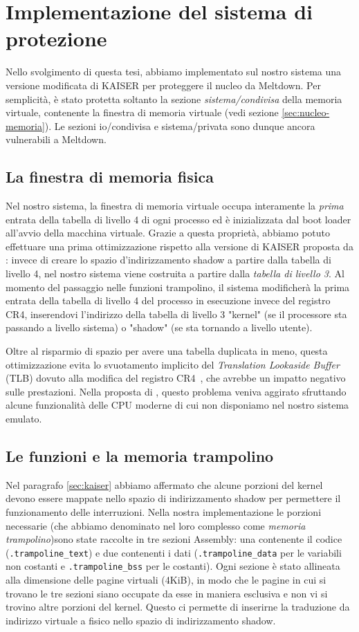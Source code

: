 \chapter{Implementazione del sistema di protezione}
Nello svolgimento di questa tesi, abbiamo implementato sul nostro sistema una versione modificata di KAISER per proteggere il nucleo da Meltdown. 
Per semplicità, è stato protetta soltanto la sezione \emph{sistema/condivisa} della memoria virtuale, contenente la finestra di memoria virtuale (vedi sezione \vref{sec:nucleo-memoria}).
Le sezioni io/condivisa e sistema/privata sono dunque ancora vulnerabili a Meltdown.

\section{La finestra di memoria fisica}
Nel nostro sistema, la finestra di memoria virtuale occupa interamente la \emph{prima} entrata della tabella di livello 4 di ogni processo ed è inizializzata dal boot loader all'avvio della macchina virtuale.
Grazie a questa proprietà, abbiamo potuto effettuare una prima ottimizzazione rispetto alla versione di KAISER proposta da \textcite{gruss:kaslr}: invece di creare lo spazio d'indirizzamento shadow a partire dalla tabella di livello 4, nel nostro sistema viene costruita a partire dalla \emph{tabella di livello 3}.
Al momento del passaggio nelle funzioni trampolino, il sistema modificherà la prima entrata della tabella di livello 4 del processo in esecuzione invece del registro CR4, inserendovi l'indirizzo della tabella di livello 3 "kernel" (se il processore sta passando a livello sistema) o "shadow" (se sta tornando a livello utente).

Oltre al risparmio di spazio per avere una tabella duplicata in meno, questa ottimizzazione evita lo svuotamento implicito del \emph{Translation Lookaside Buffer} (TLB) dovuto alla modifica del registro CR4~\cite{gruss:kaslr}, che avrebbe un impatto negativo sulle prestazioni. 
Nella proposta di \textcite{gruss:kaslr}, questo problema veniva aggirato sfruttando alcune funzionalità delle CPU moderne di cui non disponiamo nel nostro sistema emulato.

\section{Le funzioni e la memoria trampolino}
Nel paragrafo \vref{sec:kaiser} abbiamo affermato che alcune porzioni del kernel devono essere mappate nello spazio di indirizzamento shadow per permettere il funzionamento delle interruzioni.
Nella nostra implementazione le porzioni necessarie (che abbiamo denominato nel loro complesso come \emph{memoria trampolino})sono state raccolte in tre sezioni Assembly: una contenente il codice (\texttt{.trampoline\_text}) e due contenenti i dati (\texttt{.trampoline\_data} per le variabili non costanti e \texttt{.trampoline\_bss} per le costanti).
Ogni sezione è stato allineata alla dimensione delle pagine virtuali (4KiB), in modo che le pagine in cui si trovano le tre sezioni siano occupate da esse in maniera esclusiva e non vi si trovino altre porzioni del kernel.
Questo ci permette di inserirne la traduzione da indirizzo virtuale a fisico nello spazio di indirizzamento shadow.


